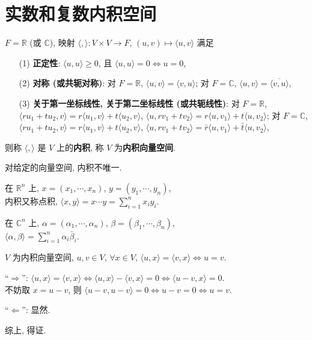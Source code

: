 \documentclass{note}
\begin{document}
\fi
\chapter{实数和复数内积空间}
\begin{df}[内积和内积空间]
    $F=\mathbb{R}$ (或 $\mathbb{C}$), 映射 $\langle,\rangle:V\times V\rightarrow F$, $(u,v)\mapsto\langle u,v\rangle$ 满足
    \begin{itemize}
        \item[(1)] \textbf{正定性}: $\langle u,u\rangle\geq 0$, 且 $\langle u,u\rangle=0\Longleftrightarrow u=0$,
        \item[(2)] \textbf{对称 (或共轭对称)}: 对 $F=\mathbb{R}$, $\langle u,v\rangle=\langle v,u\rangle$; 对 $F=\mathbb{C}$, $\langle u,v\rangle=\overline{\langle v,u\rangle}$,
        \item[(3)] \textbf{关于第一坐标线性, 关于第二坐标线性 (或共轭线性)}: 对 $F=\mathbb{R}$, $\langle ru_1+tu_2,v\rangle=r\langle u_1,v\rangle+t\langle u_2,v\rangle$, $\langle u,rv_1+tv_2\rangle=r\langle u,v_1\rangle+t\langle u,v_2\rangle$; 对 $F=\mathbb{C}$, $\langle ru_1+tu_2,v\rangle=r\langle u_1,v\rangle+t\langle u_2,v\rangle$, $\langle u,rv_1+tv_2\rangle=\bar{r}\langle u,v_1\rangle+\bar{t}\langle u,v_2\rangle$,
    \end{itemize}
    则称 $\langle,\rangle$ 是 $V$ 上的\textbf{内积}, 称 $V$ 为\textbf{内积向量空间}.
\end{df}

对给定的向量空间, 内积不唯一.

\begin{eg}
    在 $\mathbb{R}^n$ 上, $x=(x_1,\cdots,x_n)$, $y=(y_1,\cdots,y_n)$,\\
    内积又称点积, $\langle x,y\rangle=x\cdots y=\sum_{i=1}^nx_iy_i$.
\end{eg}
\begin{eg}
    在 $\mathbb{C}^n$ 上, $\alpha=(\alpha_1,\cdots,\alpha_n)$, $\beta=(\beta_1,\cdots,\beta_n)$,\\
    $\langle\alpha,\beta\rangle=\sum_{i=1}^n\alpha_i\bar{\beta}_i$.
\end{eg}

\begin{cor}[(课本引理 9.1)]
    $V$ 为内积向量空间, $u,v\in V$, $\forall x\in V$, $\langle u,x\rangle=\langle v,x\rangle\Longleftrightarrow u=v$.
\end{cor}
\begin{pf}
    ``$\Longrightarrow$'': $\langle u,x\rangle=\langle v,x\rangle\Longleftrightarrow\langle u,x\rangle-\langle v,x\rangle=0\Longleftrightarrow\langle u-v,x\rangle=0$.\\
    不妨取 $x=u-v$, 则 $\langle u-v,u-v\rangle=0\Longleftrightarrow u-v=0\Longleftrightarrow u=v$.

    ``$\Longleftarrow$'': 显然.

    综上, 得证.
\end{pf}
\end{document}
